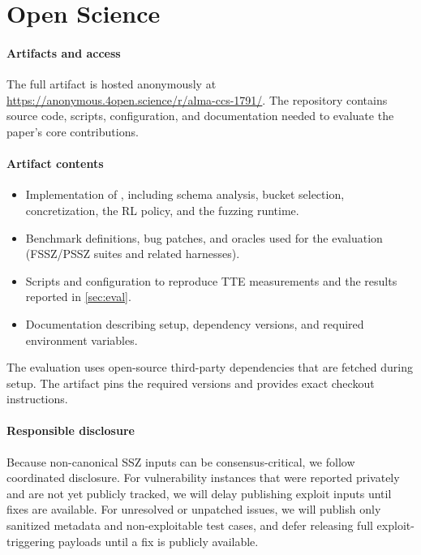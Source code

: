 \section{Open Science}\label{apdx:osci}

\paragraph{Artifacts and access}
The full artifact is hosted anonymously at \url{https://anonymous.4open.science/r/alma-ccs-1791/}. 
The repository contains source code, scripts, configuration, and documentation needed to evaluate the paper's core contributions.

\paragraph{Artifact contents}
\begin{itemize}
    \item Implementation of \tool, including schema analysis, bucket selection, concretization, the RL policy, and the fuzzing runtime.
    \item Benchmark definitions, bug patches, and oracles used for the evaluation (FSSZ/PSSZ suites and related harnesses).
    \item Scripts and configuration to reproduce TTE measurements and the results reported in \autoref{sec:eval}.
    \item Documentation describing setup, dependency versions, and required environment variables.
\end{itemize}


The evaluation uses open-source third-party dependencies that are fetched during setup.
The artifact pins the required versions and provides exact checkout instructions.

\paragraph{Responsible disclosure}
Because non-canonical SSZ inputs can be consensus-critical, we follow coordinated disclosure.
For vulnerability instances that were reported privately and are not yet publicly tracked, we will delay publishing exploit inputs until fixes are available.
For unresolved or unpatched issues, we will publish only sanitized metadata and non-exploitable test cases, and defer releasing full exploit-triggering payloads until a fix is publicly available.



